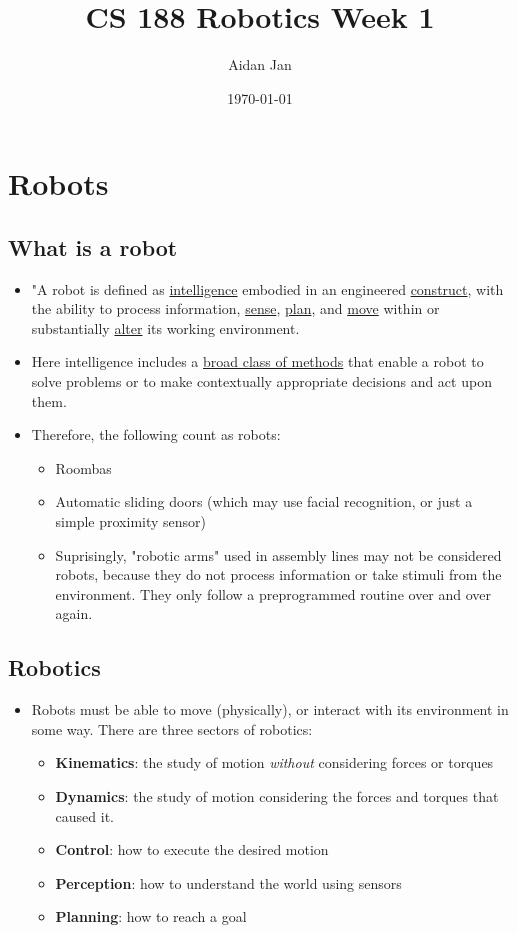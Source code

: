 \documentclass[10pt]{article}
\title{CS 188 Robotics Week 1}
\author{Aidan Jan}
\date{\today}
\begin{document}
\maketitle 

\section*{Robots}
\subsection*{What is a robot}
\begin{itemize}
    \item "A robot is defined as \underline{intelligence} embodied in an engineered \underline{construct}, with the ability to process information, \underline{sense}, \underline{plan}, and \underline{move} within or substantially \underline{alter} its working environment.
    \item Here intelligence includes a \underline{broad class of methods} that enable a robot to solve problems or to make contextually appropriate decisions and act upon them.
    \item Therefore, the following count as robots:
    \begin{itemize}
        \item Roombas
        \item Automatic sliding doors (which may use facial recognition, or just a simple proximity sensor)
        \item Suprisingly, "robotic arms" used in assembly lines may not be considered robots, because they do not process information or take stimuli from the environment.  They only follow a preprogrammed routine over and over again.
    \end{itemize}
\end{itemize}

\subsection*{Robotics}
\begin{itemize}
    \item Robots must be able to move (physically), or interact with its environment in some way.  There are three sectors of robotics:
    \begin{itemize}
        \item \textbf{Kinematics}: the study of motion \textit{without} considering forces or torques
        \item \textbf{Dynamics}: the study of motion considering the forces and torques that caused it.
        \item \textbf{Control}: how to execute the desired motion
        \item \textbf{Perception}: how to understand the world using sensors
        \item \textbf{Planning}: how to reach a goal
    \end{itemize}
\end{itemize}
\end{document}
